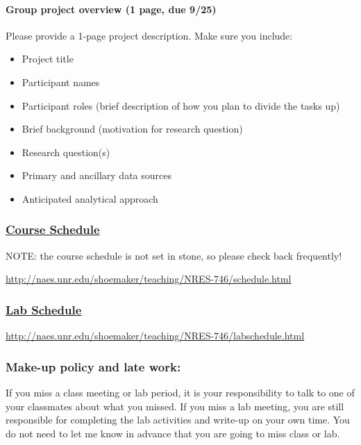 \documentclass[]{article}
\providecommand{\tightlist}{%
  \setlength{\itemsep}{0pt}\setlength{\parskip}{0pt}}
\let\oldparagraph\paragraph
\renewcommand{\paragraph}[1]{\oldparagraph{#1}\mbox{}}
\begin{document}
\paragraph{Group project overview (1 page, due
9/25)}\label{group-project-overview-1-page-due-925}

Please provide a 1-page project description. Make sure you include:

\begin{itemize}
\tightlist
\item
  Project title
\item
  Participant names
\item
  Participant roles (brief description of how you plan to divide the
  tasks up)
\item
  Brief background (motivation for research question)
\item
  Research question(s)\\
\item
  Primary and ancillary data sources
\item
  Anticipated analytical approach
\end{itemize}

\subsubsection{\texorpdfstring{\href{schedule.html}{Course
Schedule}}{Course Schedule}}\label{course-schedule}

NOTE: the course schedule is not set in stone, so please check back
frequently!

\href{schedule.html}{http://naes.unr.edu/shoemaker/teaching/NRES-746/schedule.html}

\subsubsection{\texorpdfstring{\href{labschedule.html}{Lab
Schedule}}{Lab Schedule}}\label{lab-schedule}

\href{labschedule.html}{http://naes.unr.edu/shoemaker/teaching/NRES-746/labschedule.html}

\subsubsection{Make-up policy and late
work:}\label{make-up-policy-and-late-work}

If you miss a class meeting or lab period, it is your responsibility to
talk to one of your classmates about what you missed. If you miss a lab
meeting, you are still responsible for completing the lab activities and
write-up on your own time. You do not need to let me know in advance
that you are going to miss class or lab.
\end{document}
